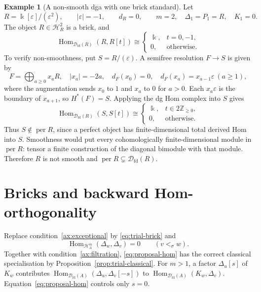 \documentclass[11pt,a4paper]{article}
\newcommand{\D}{\mathcal D}
\renewcommand{\H}{\mathcal H}
\newcommand{\ZZ}{\mathbb{Z}}
\newcommand{\std}{\Delta}
\DeclareMathOperator{\fd}{fd}
\DeclareMathOperator{\Hom}{Hom}
\DeclareMathOperator{\per}{per}
\theoremstyle{plain}
\theoremstyle{definition}
\newtheorem{example}[theorem]{Example}
\numberwithin{equation}{section}
\begin{document}
\begin{example}[A non-smooth dga with one brick standard]
\label{ex:trial-dualnumbers}
Let
\begin{equation}\label{eq:trial-dualnumbers}
 R=\Bbbk[\varepsilon]/(\varepsilon^2),\qquad
 |\varepsilon|=-1,\qquad d_R=0,
 \qquad m=2,\quad \std_1=P_1=R,\quad K_1=0.
\end{equation}
The object $R\in\H_R^2$ is a brick, and
\begin{equation}\label{eq:trial-dualnumbers-self}
 \Hom_{\D_{\fd}(R)}(R,R[t])\cong
 \begin{cases}\Bbbk,&t=0,-1,\\0,&\text{otherwise}.
 \end{cases}
\end{equation}
To verify non-smoothness, put $S=R/(\varepsilon)$.
A semifree resolution $F\to S$ is given by
\begin{equation}\label{eq:trial-dualnumbers-resolution}
 F=\bigoplus_{a\geq0}x_aR,\quad |x_a|=-2a,\quad
 d_F(x_0)=0,\quad d_F(x_a)=x_{a-1}\varepsilon\ (a\geq1),
\end{equation}
where the augmentation sends $x_0$ to $1$ and $x_a$ to $0$ for $a>0$.
Each $x_a\varepsilon$ is the boundary of $x_{a+1}$, so $H^*(F)=S$.
Applying the dg Hom complex into $S$ gives
\begin{equation}\label{eq:trial-dualnumbers-ext}
 \Hom_{\D_{\fd}(R)}(S,S[t])\cong
 \begin{cases}\Bbbk,&t\in2\ZZ_{\geq0},\\0,&\text{otherwise}.
 \end{cases}
\end{equation}
Thus $S\notin\per R$, since a perfect object has finite-dimensional
total derived Hom into $S$. Smoothness would put every
cohomologically finite-dimensional module in $\per R$: tensor a
finite construction of the diagonal bimodule with that module.
Therefore $R$ is not smooth and $\per R\subsetneq\D_{\fd}(R)$.
\end{example}

\section{Bricks and backward Hom-orthogonality}
\label{sec:proposal-hom}

Replace condition~\ref{ax:exceptional} by
\eqref{eq:trial-brick} and
\begin{equation*}\tag{H}\label{eq:proposal-hom}
 \Hom_{\H_A^m}(\std_w,\std_v)=0
 \qquad(v<_\sigma w).
\end{equation*}
Together with condition~\ref{ax:filtration},
\eqref{eq:proposal-hom} has the correct classical specialisation by
Proposition~\ref{prop:trial-classical}. For $m>1$, a factor
$\std_u[s]$ of $K_w$ contributes
$\Hom_{\D_{\fd}(A)}(\std_u,\std_v[-s])$ to
$\Hom_{\D_{\fd}(A)}(K_w,\std_v)$.
Equation~\eqref{eq:proposal-hom} controls only $s=0$.
\end{document}
